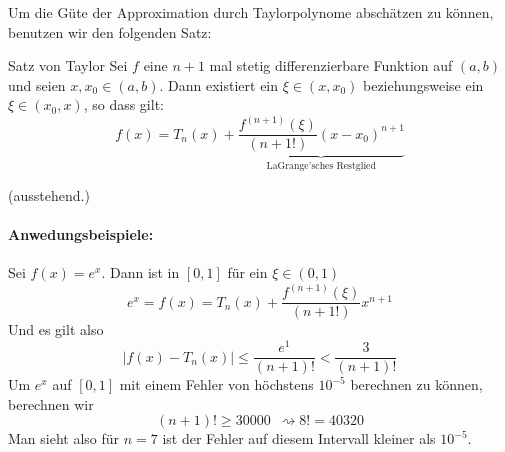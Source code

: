 Um die Güte der Approximation durch Taylorpolynome abschätzen zu können, benutzen wir den folgenden Satz:
\begin{satz}{Satz von Taylor}
Sei $f$ eine $n+1$ mal stetig differenzierbare Funktion auf $(a,b)$ und seien $x,x_0\in(a,b)$. Dann existiert ein $\xi\in(x,x_0)$ beziehungsweise ein $\xi\in(x_0,x)$, so dass gilt:
\begin{equation*}
	f(x)=T_n(x)+\underbrace{\frac{f^{(n+1)}(\xi)}{(n+1!)}(x-x_0)^{n+1}}_{\text{LaGrange'sches Restglied}}
\end{equation*}
\end{satz}
\beweis
(ausstehend.)



\paragraph{Anwedungsbeispiele:}
Sei $f(x)=e^x$. Dann ist in $[0,1]$ für ein $\xi\in(0,1)$
\begin{equation*}
	e^x=f(x)=T_n(x)+\frac{f^{(n+1)}(\xi)}{(n+1!)}x^{n+1}
\end{equation*}
Und es gilt also
\begin{equation*}
	|f(x)-T_n(x)|\leq \frac{e^1}{(n+1)!}<\frac{3}{(n+1)!}
\end{equation*}
Um $e^x$ auf $[0,1]$ mit einem Fehler von höchstens $10^{-5}$ berechnen zu können, berechnen wir
\begin{equation*}
	(n+1)!\geq 30000 \enspace\rightsquigarrow8!=40320
\end{equation*}
Man sieht also für $n=7$ ist der Fehler auf diesem Intervall kleiner als $10^{-5}$.
